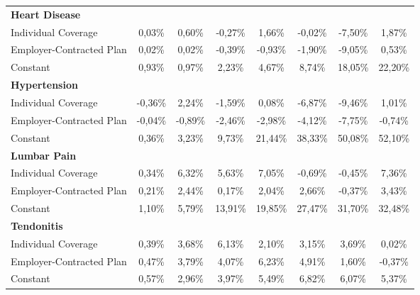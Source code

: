 \documentclass{article}
\begin{document}
\begin{table*}
{\begin{tabular}{l*{7}{c}}
\midrule
\textbf{Heart Disease} & & & & & & & \\

Individual Coverage &   0,03\%  &   0,60\%  &  -0,27\%  &   1,66\%  &  -0,02\%  &  -7,50\%\sym{**} &   1,87\% \\
Employer-Contracted Plan&   0,02\%  &   0,02\%  &  -0,39\%  &  -0,93\%  &  -1,90\%  &  -9,05\%\sym{***}&   0,53\% \\
Constant            &   0,93\%\sym{***}&   0,97\%\sym{***}&   2,23\%\sym{***}&   4,67\%\sym{***}&   8,74\%\sym{***}&  18,05\%\sym{***}&  22,20\%\sym{***}\\

\midrule
\textbf{Hypertension} & & & & & & & \\

Individual Coverage &  -0,36\%\sym{***}&   2,24\%  &  -1,59\%  &   0,08\%  &  -6,87\%\sym{*}  &  -9,46\%\sym{**} &   1,01\% \\
Employer-Contracted Plan&  -0,04\%  &  -0,89\%  &  -2,46\%\sym{*}  &  -2,98\%  &  -4,12\%  &  -7,75\%\sym{*}  &  -0,74\% \\
Constant            &   0,36\%\sym{***}&   3,23\%\sym{***}&   9,73\%\sym{***}&  21,44\%\sym{***}&  38,33\%\sym{***}&  50,08\%\sym{***}&  52,10\%\sym{***}\\

\midrule
\textbf{Lumbar Pain} & & & & & & & \\
Individual Coverage &   0,34\%  &    \cellcolor[gray]{0.9} 6,32\%\sym{**} &  \cellcolor[gray]{0.9} 5,63\%\sym{*}  &  \cellcolor[gray]{0.9} 7,05\%\sym{**} &    -0,69\%  &  -0,45\%  &   7,36\% \\
Employer-Contracted Plan&   0,21\%  &    \cellcolor[gray]{0.9}    2,44\%\sym{**} &   0,17\%  &   2,04\%  &   2,66\%  &  -0,37\%  &   3,43\% \\
Constant            &   1,10\%\sym{***}&   5,79\%\sym{***}&  13,91\%\sym{***}&  19,85\%\sym{***}&  27,47\%\sym{***}&  31,70\%\sym{***}&  32,48\%\sym{***}\\

\midrule
\textbf{Tendonitis} & & & & & & & \\

Individual Coverage &   0,39\%  &     \cellcolor[gray]{0.9}   3,68\%\sym{*}  &   \cellcolor[gray]{0.9}     6,13\%\sym{***}&   2,10\%  &   3,15\%  &   3,69\%  &   0,02\% \\
Employer-Contracted Plan&   0,47\%  &   \cellcolor[gray]{0.9}     3,79\%\sym{***}&   \cellcolor[gray]{0.9}     4,07\%\sym{***}&    \cellcolor[gray]{0.9}    6,23\%\sym{***}&  \cellcolor[gray]{0.9} 4,91\%\sym{***}&   1,60\%  &  -0,37\% \\
Constant            &   0,57\%\sym{***}&   2,96\%\sym{***}&   3,97\%\sym{***}&   5,49\%\sym{***}&   6,82\%\sym{***}&   6,07\%\sym{***}&   5,37\%\sym{***}\\


\end{tabular}}
\end{table*}
\end{document}
